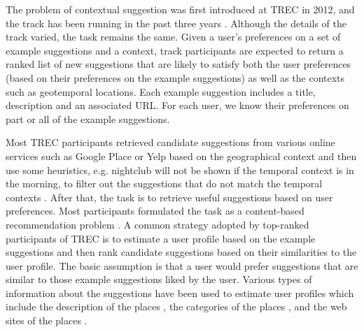 The problem of contextual suggestion was first introduced at
TREC in 2012, and the track has been running in the past 
three years \cite{adriel:overview, adriel:overview2013}. 
Although the details of the track varied, the task remains 
the same.  Given a user's preferences on a set of example 
suggestions and a context, track participants
are expected to return a ranked list of new suggestions that 
are likely to satisfy both the user preferences (based on their preferences
on the example suggestions) as well as the contexts such as 
geotemporal locations. Each example suggestion includes a title, 
description and an associated URL. For each user, we know their 
preferences on part or all of the example suggestions. 

Most TREC participants retrieved
candidate suggestions from various online services such as 
Google Place %
or Yelp %
based on the geographical context
and then use some heuristics, e.g. nightclub will not be shown if 
the temporal context is in the morning, to filter out the 
suggestions that do not match the temporal contexts 
\cite{adriel:overview, adriel:overview2013}.
After that, the task is to retrieve useful suggestions based on 
user preferences. Most participants formulated the task as a 
content-based recommendation problem 
\cite{irit:treccs2012,georgetown:treccs2012,
udel:treccs2012,udben:treccs2012, isi:treccs2013, up:treccs2013, udel:treccs2014, cmu:treccs2014, bjut:treccs2014, rama:treccs2014, glasgow:treccs2014}. 
A common strategy adopted by top-ranked participants of TREC is to 
estimate a user profile based on the example suggestions and then rank 
candidate suggestions based on their similarities to the user profile. 
The basic assumption is that a user would prefer suggestions that are 
similar to those example suggestions liked by the user.  
Various types of information about the suggestions have been used
to estimate user profiles which include 
the description of the places \cite{udel:treccs2012,irit:treccs2012,up:treccs2013}, 
the categories of the places \cite{rama:treccs2014,bjut:treccs2014,glasgow:treccs2014,
georgetown:treccs2012,uamst:treccs2013},
and the web sites of the places \cite{udel:treccs2012,irit:treccs2012,up:treccs2013}.

